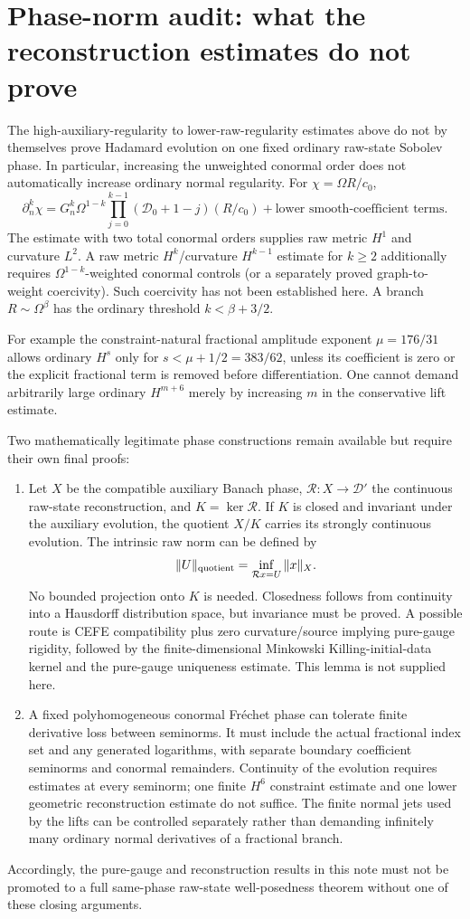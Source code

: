 \documentclass[11pt]{article}
\begin{document}
\section{Phase-norm audit: what the reconstruction estimates do not prove}
The high-auxiliary-regularity to lower-raw-regularity estimates above do not by themselves prove Hadamard evolution on one fixed ordinary raw-state Sobolev phase. In particular, increasing the unweighted conormal order does not automatically increase ordinary normal regularity. For $\chi=\Omega R/c_0$,
\[
 \partial_n^k\chi
 =G_n^k\Omega^{1-k}
 \prod_{j=0}^{k-1}(\mathcal D_0+1-j)(R/c_0)
 +\text{lower smooth-coefficient terms}.
\]
The estimate with two total conormal orders supplies raw metric $H^1$ and curvature $L^2$. A raw metric $H^k$/curvature $H^{k-1}$ estimate for $k\ge2$ additionally requires $\Omega^{1-k}$-weighted conormal controls (or a separately proved graph-to-weight coercivity). Such coercivity has not been established here. A branch $R\sim\Omega^\beta$ has the ordinary threshold $k<\beta+3/2$.

For example the constraint-natural fractional amplitude exponent $\mu=176/31$ allows ordinary $H^s$ only for $s<\mu+1/2=383/62$, unless its coefficient is zero or the explicit fractional term is removed before differentiation. One cannot demand arbitrarily large ordinary $H^{m+6}$ merely by increasing $m$ in the conservative lift estimate.

Two mathematically legitimate phase constructions remain available but require their own final proofs:
\begin{enumerate}
\item Let $X$ be the compatible auxiliary Banach phase, $\mathcal R:X\to\mathcal D'$ the continuous raw-state reconstruction, and $K=\ker\mathcal R$. If $K$ is closed and invariant under the auxiliary evolution, the quotient $X/K$ carries its strongly continuous evolution. The intrinsic raw norm can be defined by
\[
 \|U\|_{\rm quotient}=\inf_{\mathcal R x=U}\|x\|_X.
\]
No bounded projection onto $K$ is needed. Closedness follows from continuity into a Hausdorff distribution space, but invariance must be proved. A possible route is CEFE compatibility plus zero curvature/source implying pure-gauge rigidity, followed by the finite-dimensional Minkowski Killing-initial-data kernel and the pure-gauge uniqueness estimate. This lemma is not supplied here.
\item A fixed polyhomogeneous conormal Fr\'echet phase can tolerate finite derivative loss between seminorms. It must include the actual fractional index set and any generated logarithms, with separate boundary coefficient seminorms and conormal remainders. Continuity of the evolution requires estimates at every seminorm; one finite $H^6$ constraint estimate and one lower geometric reconstruction estimate do not suffice. The finite normal jets used by the lifts can be controlled separately rather than demanding infinitely many ordinary normal derivatives of a fractional branch.
\end{enumerate}
Accordingly, the pure-gauge and reconstruction results in this note must not be promoted to a full same-phase raw-state well-posedness theorem without one of these closing arguments.
\end{document}
